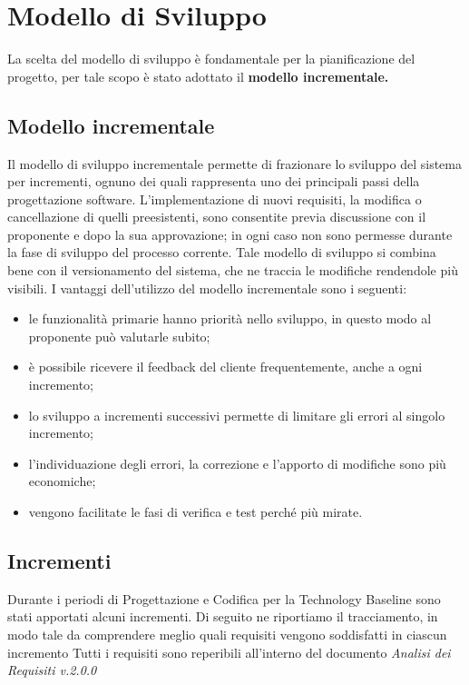 \section{Modello di Sviluppo}
La scelta del modello di sviluppo è fondamentale per la pianificazione del progetto, per tale scopo è stato adottato il \textbf{modello incrementale.}

\subsection{Modello incrementale}
Il modello di sviluppo incrementale permette di frazionare lo sviluppo del sistema per incrementi, ognuno dei quali rappresenta uno dei principali passi della progettazione software.
L'implementazione di nuovi requisiti, la modifica o cancellazione di quelli preesistenti, sono consentite previa discussione con il proponente e dopo la sua approvazione; in ogni caso non sono permesse durante la fase di sviluppo del processo corrente.
Tale modello di sviluppo si combina bene con il versionamento del sistema, che ne traccia le modifiche rendendole più visibili.
I vantaggi dell'utilizzo del modello incrementale sono i seguenti:
\begin{itemize}
    \item le funzionalità primarie hanno priorità nello sviluppo, in questo modo al proponente può valutarle subito;
    \item è possibile ricevere il feedback del cliente frequentemente, anche a ogni incremento;
    \item lo sviluppo a incrementi successivi permette di limitare gli errori al singolo incremento;
    \item l'individuazione degli errori, la correzione e l'apporto di modifiche sono più economiche;
    \item vengono facilitate le fasi di verifica e test perché più mirate.
\end{itemize}

\subsection{Incrementi}
Durante i periodi di Progettazione e Codifica per la Technology Baseline sono stati apportati alcuni incrementi. Di seguito ne riportiamo il tracciamento, in modo tale da comprendere meglio quali requisiti vengono soddisfatti in ciascun incremento
\newline
Tutti i requisiti sono reperibili all'interno del documento \textit{Analisi dei Requisiti v.2.0.0}
